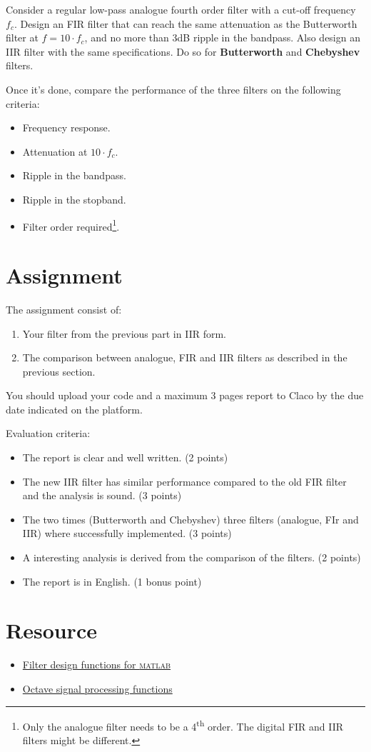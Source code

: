 \documentclass{../template/labo}
\newcommand{\matlab}{\textsc{matlab}}
\begin{document}
Consider a regular low-pass analogue fourth order filter with a cut-off frequency $f_c$.
Design an FIR filter that can reach the same attenuation as the Butterworth filter at $f = 10\cdot f_c$, and no more than 3dB ripple in the bandpass.
Also design an IIR filter with the same specifications.
Do so for \textbf{Butterworth} and \textbf{Chebyshev} filters.

Once it's done, compare the performance of the three filters on the following criteria:
\begin{itemize}
  \item Frequency response.
  \item Attenuation at $10\cdot f_c$.
  \item Ripple in the bandpass.
  \item Ripple in the stopband.
  \item Filter order required\footnote{Only the analogue filter needs to be a 4\textsuperscript{th} order. The digital FIR and IIR filters might be different.}.
\end{itemize}



\section*{Assignment}
The assignment consist of:
\begin{enumerate}
  \item Your filter from the previous part in IIR form.
  \item The comparison between analogue, FIR and IIR filters as described in the previous section.
\end{enumerate}
You should upload your code and a maximum 3 pages report to Claco by the due date indicated on the platform.

Evaluation criteria:
\begin{itemize}
  \item The report is clear and well written. (2 points)
  \item The new IIR filter has similar performance compared to the old FIR filter and the analysis is sound. (3 points)
  \item The two times (Butterworth and Chebyshev) three filters (analogue, FIr and IIR) where successfully implemented. (3 points)
  \item A interesting analysis is derived from the comparison of the filters. (2 points)
  \item The report is in English. (1 bonus point)
\end{itemize}




\section*{Resource}
\begin{itemize}
	\item \href{https://www.mathworks.com/help/signal/referencelist.html?type=function&category=filter-design&s_tid=CRUX_topnav}{Filter design functions for \matlab}
  \item \href{https://octave.sourceforge.io/signal/overview.html}{Octave signal processing functions}
\end{itemize}
\end{document}
